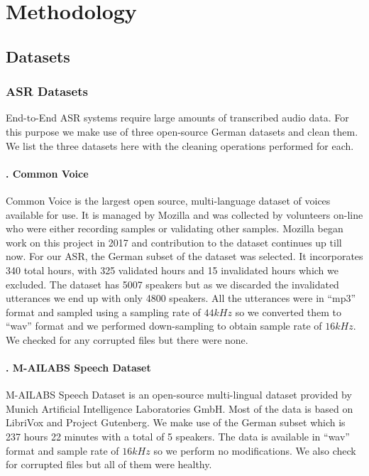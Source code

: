 \chapter{Methodology}
\label{chap:methodology}


\section{Datasets} 
\label{meth:s1}


\subsection{\ac{ASR} Datasets}
\label{meth:sub1}

End-to-End \ac{ASR} systems require large amounts of transcribed audio data. For this purpose we make use of three open-source German datasets and clean them. We list the three datasets here with the cleaning operations performed for each. 


\subsubsection{. Common Voice}
\label{meth:subsubsub1}

Common Voice is the largest open source, multi-language dataset of voices available for use. It is managed by Mozilla and was collected by volunteers on-line who were either recording samples or validating other samples. Mozilla began work on this project in 2017 and contribution to the dataset continues up till now. 
For our \ac{ASR}, the German subset of the dataset was selected. It incorporates 340 total hours, with 325 validated hours and 15 invalidated hours which we excluded. The dataset has 5007 speakers but as we discarded the invalidated utterances we end up with only 4800 speakers. 
All the utterances were in \enquote{mp3} format and sampled using a sampling rate of $44 kHz$ so we converted them to \enquote{wav} format and we performed down-sampling to obtain sample rate of $16 kHz$. We checked for any corrupted files but there were none.


\subsubsection{. M-AILABS Speech Dataset}
\label{meth:subsub2}
M-AILABS Speech Dataset is an open-source multi-lingual dataset provided by Munich Artificial Intelligence Laboratories GmbH. Most of the data is based on LibriVox and Project Gutenberg. We make use of the German subset which is 237 hours 22 minutes with a total of 5 speakers. The data is available in \enquote{wav} format and sample rate of $16 kHz$ so we perform no modifications. We also check for corrupted files but all of them were healthy.

